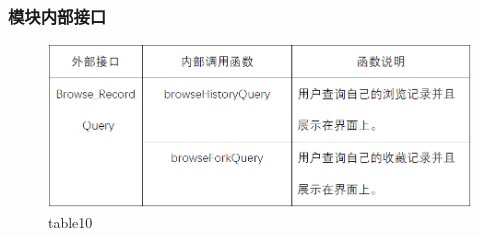 \subsubsection{模块内部接口}
\begin{figure}[!htbp]
	\centering
	\includegraphics[scale=0.7]{image/b10.png} %
	\caption{table10} %
\end{figure}
